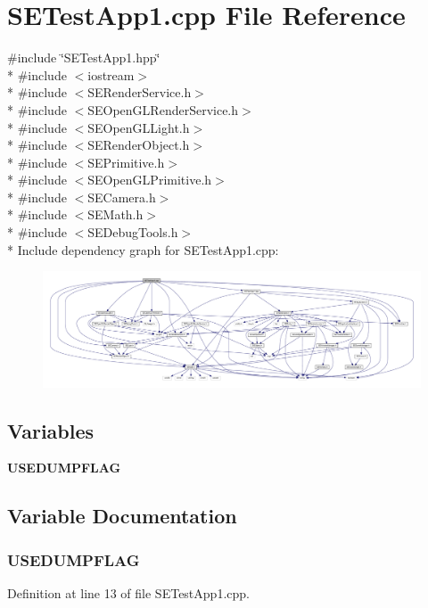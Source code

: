 \section{S\+E\+Test\+App1.\+cpp File Reference}
\label{_s_e_test_app1_8cpp}
{\ttfamily \#include \char`\"{}S\+E\+Test\+App1.\+hpp\char`\"{}}\\*
{\ttfamily \#include $<$iostream$>$}\\*
{\ttfamily \#include $<$S\+E\+Render\+Service.\+h$>$}\\*
{\ttfamily \#include $<$S\+E\+Open\+G\+L\+Render\+Service.\+h$>$}\\*
{\ttfamily \#include $<$S\+E\+Open\+G\+L\+Light.\+h$>$}\\*
{\ttfamily \#include $<$S\+E\+Render\+Object.\+h$>$}\\*
{\ttfamily \#include $<$S\+E\+Primitive.\+h$>$}\\*
{\ttfamily \#include $<$S\+E\+Open\+G\+L\+Primitive.\+h$>$}\\*
{\ttfamily \#include $<$S\+E\+Camera.\+h$>$}\\*
{\ttfamily \#include $<$S\+E\+Math.\+h$>$}\\*
{\ttfamily \#include $<$S\+E\+Debug\+Tools.\+h$>$}\\*
Include dependency graph for S\+E\+Test\+App1.\+cpp\+:
\nopagebreak
\begin{figure}[H]
\begin{center}
\leavevmode
\includegraphics[width=350pt]{_s_e_test_app1_8cpp__incl}
\end{center}
\end{figure}
\subsection*{Variables}
\begin{DoxyCompactItemize}
\item 
{\bf U\+S\+E\+D\+U\+M\+P\+F\+L\+A\+G}
\end{DoxyCompactItemize}


\subsection{Variable Documentation}
\subsubsection[{U\+S\+E\+D\+U\+M\+P\+F\+L\+A\+G}]{\setlength{\rightskip}{0pt plus 5cm}U\+S\+E\+D\+U\+M\+P\+F\+L\+A\+G}\label{_s_e_test_app1_8cpp_adf706a38197b60bc3bf6b16557554414}


Definition at line 13 of file S\+E\+Test\+App1.\+cpp.

